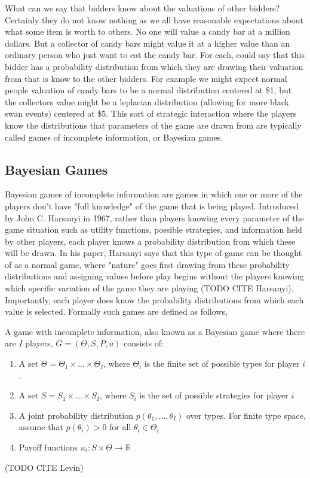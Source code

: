 \documentclass[12pt,twoside]{reedthesis}
\begin{document}
What can we say that bidders know about the valuations of other bidders? Certainly they do not know nothing as we all have reasonable expectations about what some item is worth to others. No one will value a candy bar at a million dollars. But a collector of candy bars might value it at a higher value than an ordinary person who just want to eat the candy bar. For each, could say that this bidder has a probability distribution from which they are drawing their valuation from that is know to the other bidders. For example we might expect normal people valuation of candy bars to be a normal distribution centered at \$1, but the collectors value might be a leplacian distribution (allowing for more black swan events) centered at \$5. This sort of strategic interaction where the players know the distributions that parameters of the game are drawn from are typically called games of incomplete information, or Bayesian games.
 
\subsection{Bayesian Games}
Bayesian games of incomplete information are games in which one or more of the players don't have "full knowledge" of the game that is being played. Introduced by John C. Harsanyi in 1967, rather than players knowing every parameter of the game situation such as utility functions, possible strategies, and information held by other players, each player knows a probability distribution from which these will be drawn. In his paper, Harsanyi says that this type of game can be thought of as a normal game, where "nature" goes first drawing from these probability distributions and assigning values before play begins without the players knowing which specific variation of the game they are playing (TODO CITE Harsanyi). Importantly, each player does know the probability distributions from which each value is selected. Formally such games are defined as follows, 

\begin{dfn}
	A game with incomplete information, also known as a Bayesian game where there are $I$ players, $G = (\Theta, S, P, u)$ consists of:
	\begin{enumerate}
		\item A set $\Theta = \Theta_1 \times \ldots \times \Theta_I$, where $\Theta_i$ is the finite set of possible types for player $i$.
		\item A set $S = S_1 \times \ldots \times S_I$, where $S_i$ is the set of possible strategies for player $i$
		\item A joint probability distribution $p(\theta_1, \dots , \theta_I)$ over types. For finite type space, assume that $p(\theta_i) > 0$ for all $\theta_i \in \Theta_i$
		\item Payoff functions $u_i : S \times \Theta \rightarrow \mathbb{R}$
	\end{enumerate} 
\end{dfn} (TODO CITE Levin)
\end{document}
